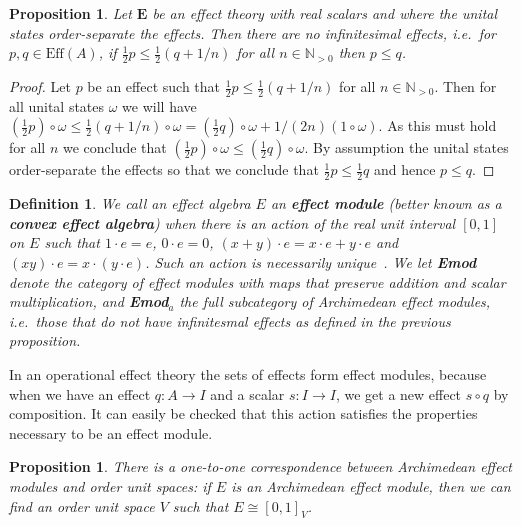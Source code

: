 \documentclass[a4paper,onecolumn,10pt,accepted=2019-05-03, issue=1, volume=1, shorttitle=papers/compositionality-1-1]{compositionalityarticle}
\newcounter{counter}
\numberwithin{counter}{section}
\newtheorem{proposition}[counter]{Proposition}
\newtheorem{definition}[counter]{Definition}
\newcommand{\N}{\mathbb{N}}
\newcommand{\pred}{\text{Eff}}
\begin{document}
\begin{proposition}
    Let $\mathbf{E}$ be an effect theory with real scalars and where the unital states order-separate the effects. Then there are no infinitesimal effects, i.e.~for $p,q\in\pred(A)$, if $\frac{1}{2}p\leq \frac{1}{2}(q+1/n)$ for all $n\in\N_{>0}$ then $p\leq q$.
\end{proposition}
\begin{proof}
    Let $p$ be an effect such that $\frac{1}{2}p\leq \frac{1}{2}(q+1/n)$ for all $n\in \N_{>0}$. Then for all unital states $\omega$ we will have $(\frac{1}{2}p)\circ \omega\leq \frac{1}{2}(q+1/n)\circ \omega = (\frac{1}{2}q)\circ\omega + 1/(2n)(1\circ \omega)$. 
    As this must hold for all $n$ we conclude that $(\frac{1}{2}p)\circ \omega\leq (\frac{1}{2}q)\circ \omega$. 
    By assumption the unital states order-separate the effects so that we conclude that $\frac{1}{2}p\leq \frac{1}{2}q$ and hence $p\leq q$.
\end{proof}


\begin{definition}
    We call an effect algebra $E$ an \textbf{effect module} (better known as a \textbf{convex effect algebra}) when there is an action of the real unit interval $[0,1]$ on $E$ such that $1\cdot e = e$, $0\cdot e = 0$, $(x+y)\cdot e = x\cdot e + y\cdot e$ and $(xy)\cdot e = x\cdot (y\cdot e)$. Such an action is necessarily unique~\cite{gudder1999convex}. We let \textbf{Emod} denote the category of effect modules with maps that preserve addition and scalar multiplication, and \textbf{Emod}$_a$ the full subcategory of \emph{Archimedean} effect modules, i.e.~those that do not have infinitesmal effects as defined in the previous proposition.
\end{definition}

In an operational effect theory the sets of effects form effect modules, because when we have an effect $q:A\rightarrow I$ and a scalar $s: I\rightarrow I$, we get a new effect $s\circ q$ by composition. It can easily be checked that this action satisfies the properties necessary to be an effect module.

\begin{proposition}
\cite{gudder1999convex,jacobs2016expectation} There is a one-to-one correspondence between Archimedean effect modules and order unit spaces: if $E$ is an Archimedean effect module, then we can find an order unit space $V$ such that $E\cong [0,1]_V$.
\end{proposition}
\end{document}
